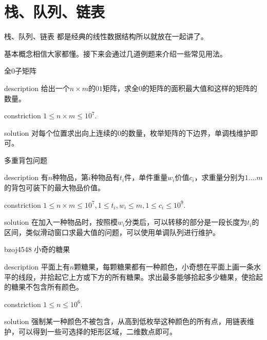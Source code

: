 \documentclass{beamer}
\begin{document}
	\section{栈、队列、链表}
	\begin{frame}{栈、队列、链表}
		都是经典的线性数据结构所以就放在一起讲了。
		
		基本概念相信大家都懂。接下来会通过几道例题来介绍一些常见用法。
	\end{frame}
	\begin{frame}{全$0$子矩阵}
		\begin{block}{description}
			给出一个$n\times m$的$01$矩阵，求全$0$的矩阵的面积最大值和这样的矩阵的数量。
		\end{block}
		\begin{block}{constriction}
			$1 \le n \times m \le 10^7.$
		\end{block}
		\pause
		\begin{block}{solution}
			对每个位置求出向上连续的$0$的数量，枚举矩阵的下边界，单调栈维护即可。
		\end{block}
	\end{frame}
	\begin{frame}{多重背包问题}
		\begin{block}{description}
			有$n$种物品，第$i$种物品有$t_i$件，单件重量$w_i$价值$c_i$，求重量分别为$1....m$的背包可装下的最大物品价值。
		\end{block}
		\begin{block}{constriction}
			$1 \le n \times m \le 10^7, 1 \le t_i, w_i \le m, 1 \le c_i \le 10^9.$
		\end{block}
		\pause
		\begin{block}{solution}
			在加入一种物品时，按照模$w_i$分类后，可以转移的部分是一段长度为$t_i$的区间，类似滑动窗口求最大值的问题，可以使用单调队列进行维护。
		\end{block}
	\end{frame}
	\begin{frame}{bzoj4548 小奇的糖果}
		\begin{block}{description}
			平面上有$n$颗糖果，每颗糖果都有一种颜色，小奇想在平面上画一条水平的线段，并拾起它上方或下方的所有糖果。求出最多能够拾起多少糖果，使拾起的糖果不包含所有颜色。
		\end{block}
		\begin{block}{constriction}
			$1 \le n \le 10^6.$
		\end{block}
		\pause
		\begin{block}{solution}
			强制某一种颜色不被包含，从高到低枚举这种颜色的所有点，用链表维护，可以得到一些可选择的矩形区域，二维数点即可。
		\end{block}
	\end{frame}
\end{document}
